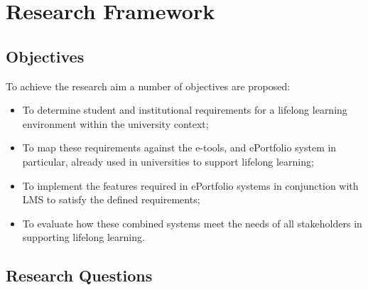 \chapter{Research Framework\label{cha:method}}

\section{Objectives}

To achieve the research aim a number of objectives are proposed:
\begin{itemize}
  \item To determine student and institutional requirements for a lifelong learning
environment within the university context;
  \item To map these requirements against the e-tools, and ePortfolio system in
particular, already used in universities to support lifelong learning;
  \item To implement the features required in ePortfolio systems in conjunction
with LMS to satisfy the defined requirements;
  \item To evaluate how these combined systems meet the needs of all
stakeholders in supporting lifelong learning.
\end{itemize}

\section{Research Questions}

